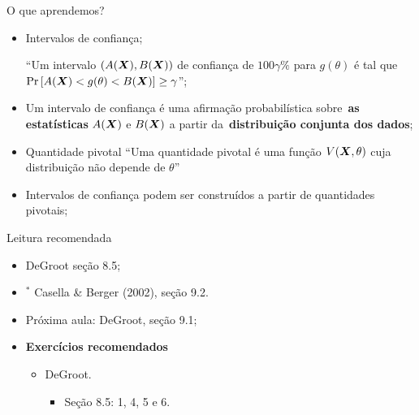 \begin{frame}{O que aprendemos?}
\begin{itemize}

  \item[\faLightbulbO] Intervalos de confiança;    
  
   ``Um intervalo $(A(\boldsymbol{X}), B(\boldsymbol{X}))$  de confiança de $100\gamma\%$ para $g(\theta)$ é tal que $\operatorname{Pr}\left[ A(\boldsymbol{X}) < g(\theta) <  B(\boldsymbol{X}) \right] \geq \gamma$'';
   
  \item[\faLightbulbO] Um intervalo de confiança é uma afirmação probabilística sobre~\textbf{as estatísticas} $A(\boldsymbol{X})$ e $B(\boldsymbol{X})$ a partir da~\textbf{distribuição conjunta dos dados};
  
  \item[\faLightbulbO] Quantidade pivotal
  ``Uma quantidade pivotal é uma função $V(\boldsymbol{X}, \theta)$ cuja distribuição não depende de $\theta$''
     
   \item[\faLightbulbO] Intervalos de confiança podem ser construídos a partir de quantidades pivotais;  
  
  \end{itemize}
 \end{frame}

\begin{frame}{Leitura recomendada}
\begin{itemize}
 \item[\faBook] DeGroot seção 8.5;
 \item[\faBook] $^\ast$ Casella \& Berger (2002), seção 9.2.
 \item[\faForward] Próxima aula: DeGroot, seção 9.1;
 \item {\large\textbf{Exercícios recomendados}}
 \begin{itemize}
  \item[\faBookmark] DeGroot.
  \begin{itemize}
   \item Seção 8.5: 1, 4, 5 e 6.
  \end{itemize}   
  \end{itemize}
 \end{itemize} 
\end{frame}
